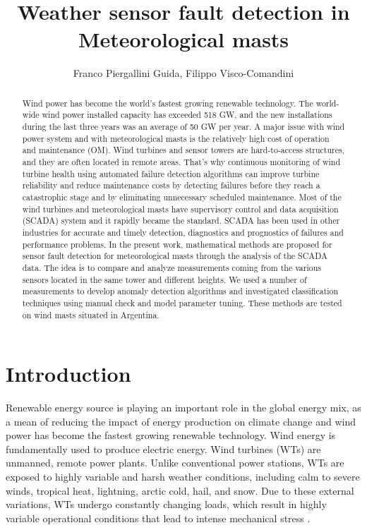 \documentclass[journal]{IEEEtran}
\begin{document}
\title{Weather sensor fault detection in Meteorological masts}

\author{Franco Piergallini Guida, Filippo Visco-Comandini}
\maketitle

\begin{abstract}
Wind power has become the world's fastest growing renewable technology. The world-wide wind power installed capacity has exceeded 518 GW, and the new installations during the last three years was an average of 50 GW per year. A major issue with wind power system and with meteorological masts is the relatively high cost of operation and maintenance (OM). Wind turbines and sensor towers are hard-to-access structures, and they are often located in remote areas. That's why continuous monitoring of wind turbine health using automated failure detection algorithms can improve turbine reliability and reduce maintenance costs by detecting failures before they reach a catastrophic stage and by eliminating unnecessary scheduled maintenance.
Most of the wind turbines and meteorological masts have supervisory control and data acquisition (SCADA) system and it rapidly became the standard. SCADA has been used in other industries for accurate and timely detection, diagnostics and prognostics of failures and performance problems.
In the present work, mathematical methods are proposed for sensor fault detection for meteorological masts through the analysis of the SCADA data. The idea is to compare and analyze measurements coming from the various sensors located in the same tower and different heights. We used a number of measurements to develop anomaly detection algorithms and investigated classification techniques using manual check and model parameter tuning. 
These methods are tested on wind masts situated in Argentina.
\end{abstract}
\section{Introduction}
Renewable energy source is playing an important role in the global energy mix, as a mean of reducing the impact of energy production on climate change and wind power has become the fastest growing renewable technology. 
Wind energy is fundamentally used to produce electric energy. Wind turbines (WTs) are unmanned, remote power plants. Unlike conventional power stations, WTs are exposed to highly variable and harsh weather conditions, including calm to severe winds, tropical heat, lightning, arctic cold, hail, and snow. Due to these external variations, WTs undergo constantly changing loads, which result in highly variable operational conditions that lead to intense mechanical stress \cite{ribrant2006thesis}. 
\end{document}
